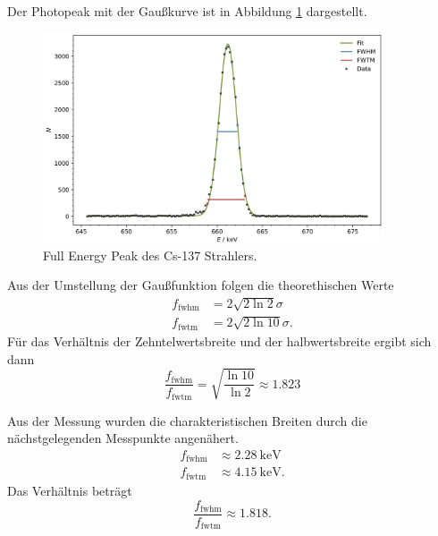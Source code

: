 Der Photopeak mit der Gaußkurve ist in Abbildung \ref{fig:plot8} dargestellt.

\begin{figure}[H]
    \centering
    \includegraphics[width=0.9\textwidth]{content/plots/plot8.jpg}
    \caption{Full Energy Peak des Cs-137 Strahlers.}
    \label{fig:plot8}
\end{figure}

Aus der Umstellung der Gaußfunktion folgen die theorethischen Werte
\begin{align*}
 f_{\text{fwhm}} &= 2 \sqrt{2 \ln{2}} \sigma \\
 f_{\text{fwtm}} &= 2 \sqrt{2 \ln{10}} \sigma.
\end{align*}
Für das Verhältnis der Zehntelwertsbreite und der halbwertsbreite ergibt sich dann
\begin{equation*}
  \frac{f_{\text{fwhm}}}{f_{\text{fwtm}}} = \sqrt{\frac{\ln{10}}{\ln{2}}} \approx \num{1.823}
\end{equation*}

Aus der Messung wurden die charakteristischen Breiten durch die nächstgelegenden Messpunkte angenähert. 
\begin{align*}
    f_{\text{fwhm}} &\approx \qty{2.28}{\kilo\eV}\\
    f_{\text{fwtm}} &\approx \qty{4.15}{\kilo\eV}.
\end{align*}
Das Verhältnis beträgt
\begin{equation*}
    \frac{f_{\text{fwhm}}}{f_{\text{fwtm}}} \approx \num{1.818}.
\end{equation*}
   